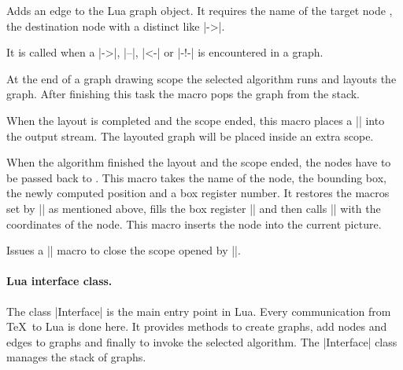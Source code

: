 \begin{command}{\pgfgdaddedge{}}
  Adds an edge to the Lua graph object. It requires the name of the target node , the destination node  with a distinct  like |->|.

  It is called when a |->|, |--|, |<-| or |-!-| is encountered in a graph.
\end{command}

\begin{command}{\pgfgdendscope}
  At the end of a graph drawing scope the selected algorithm runs and layouts the graph. After finishing this task the macro pops the graph from the stack.
\end{command}

\begin{command}{\pgfgdbeginshipout}
  When the layout is completed and the scope ended, this macro places a |\scope| into the output stream. The layouted graph will be placed inside an extra scope.
\end{command}

\begin{command}{\pgfgdinternalshipoutnode{}}
  When the algorithm finished the layout and the scope ended, the nodes have to be passed back to \tikzname. This macro takes the name of the node, the bounding box, the newly computed position and a box register number. It restores the macros set by |\pgfpositionnodelater| as mentioned above, fills the box register |\pgfpositionnodelaterbox| and then calls |\pgfpositionnodenow| with the coordinates of the node. This macro inserts the node into the current picture.
\end{command}

\begin{command}{\pgfgdendshipout}
  Issues a |\endscope| macro to close the scope opened by |\pgfgdbeginshipout|.
\end{command}

\paragraph{Lua interface class.}

The class |Interface| is the main entry point in Lua. Every communication from \TeX\ to Lua is done here.
It provides methods to create graphs, add nodes and edges to graphs and finally to invoke the selected algorithm. The |Interface| class manages the stack of graphs.

